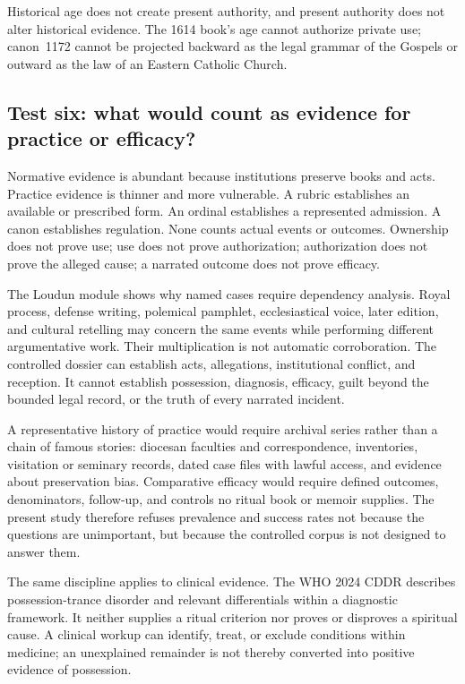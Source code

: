 Historical age does not create present authority, and present authority does
not alter historical evidence. The 1614 book's age cannot authorize private
use; canon~1172 cannot be projected backward as the legal grammar of the
Gospels or outward as the law of an Eastern Catholic Church.

\subsection{Test six: what would count as evidence for practice or efficacy?}

Normative evidence is abundant because institutions preserve books and acts.
Practice evidence is thinner and more vulnerable. A rubric establishes an
available or prescribed form. An ordinal establishes a represented admission.
A canon establishes regulation. None counts actual events or outcomes.
Ownership does not prove use; use does not prove authorization; authorization
does not prove the alleged cause; a narrated outcome does not prove efficacy.

The Loudun module shows why named cases require dependency analysis. Royal
process, defense writing, polemical pamphlet, ecclesiastical voice, later
edition, and cultural retelling may concern the same events while performing
different argumentative work. Their multiplication is not automatic
corroboration. The controlled dossier can establish acts, allegations,
institutional conflict, and reception. It cannot establish possession,
diagnosis, efficacy, guilt beyond the bounded legal record, or the truth of
every narrated incident.

A representative history of practice would require archival series rather
than a chain of famous stories: diocesan faculties and correspondence,
inventories, visitation or seminary records, dated case files with lawful
access, and evidence about preservation bias. Comparative efficacy would
require defined outcomes, denominators, follow-up, and controls no ritual book
or memoir supplies. The present study therefore refuses prevalence and success
rates not because the questions are unimportant, but because the controlled
corpus is not designed to answer them.

The same discipline applies to clinical evidence. The WHO 2024 CDDR describes
possession-trance disorder and relevant differentials within a diagnostic
framework. It neither supplies a ritual criterion nor proves or disproves a
spiritual cause. A clinical workup can identify, treat, or exclude conditions
within medicine; an unexplained remainder is not thereby converted into
positive evidence of possession.

